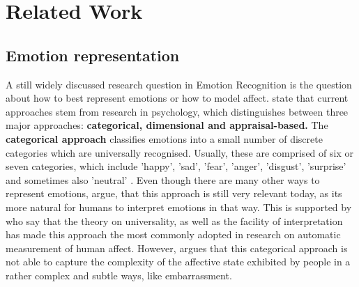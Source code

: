 
\chapter{Related Work}

\section{Emotion representation}
A still widely discussed research question in Emotion Recognition is the question about how to best represent emotions or how to model affect. \citet{Gunes:2011:EmotionRepresentationContinuous} state that current approaches stem from research in psychology, which distinguishes between three major approaches: \textbf{categorical, dimensional and appraisal-based.}
\newline\newline
The \textbf{categorical approach} classifies emotions into a small number of discrete categories which are universally recognised. Usually, these are comprised of six or seven categories, which include 'happy', 'sad', 'fear', 'anger', 'disgust', 'surprise' and sometimes also 'neutral' \citep{Hupont:2010:FacialEmotionsIn2DAffectiveSpace}. Even though there are many other ways to represent emotions, \citet{Salah:2018:VideoBasedER} argue, that this approach is still very relevant today, as its more natural for humans to interpret emotions in that way. This is supported by \citet{Gunes:2011:EmotionRepresentationContinuous} who say that the theory on universality, as well as the facility of interpretation has made this approach the most commonly adopted in research on automatic measurement of human affect.
\newline\newline
However, \citet{Gunes:2011:EmotionRepresentationContinuous} argues that this categorical approach is not able to capture the complexity of the affective state exhibited by people in a rather complex and subtle ways, like embarrassment.
